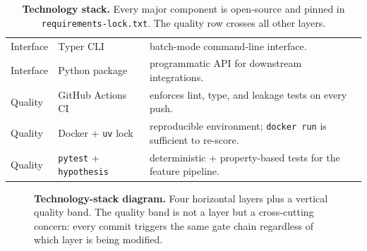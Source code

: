 \documentclass[11pt,a4paper,oneside]{report}
\begin{document}
\begin{table}[htbp]
\begin{tabularx}{\linewidth}{@{}l l X@{}}
Interface &
Typer CLI &
batch-mode command-line interface. \\
Interface &
Python package &
programmatic API for downstream integrations. \\
\midrule
Quality &
GitHub Actions CI &
enforces lint, type, and leakage tests on every push. \\
Quality &
Docker + \texttt{uv} lock &
reproducible environment; \texttt{docker run} is sufficient to re-score. \\
Quality &
\texttt{pytest} + \texttt{hypothesis} &
deterministic + property-based tests for the feature pipeline. \\
\bottomrule
\end{tabularx}
\caption[Technology stack]{\textbf{Technology stack.} Every
major component is open-source and pinned in
\texttt{requirements-lock.txt}. The quality row crosses all
other layers.}
\label{tab:tech-stack}
\end{table}

\begin{figure}[htbp]
\centering
{}
\caption[Technology-stack diagram]{\textbf{Technology-stack
diagram.} Four horizontal layers plus a vertical quality
band. The quality band is not a layer but a cross-cutting
concern: every commit triggers the same gate chain
regardless of which layer is being modified.}
\label{fig:tech-stack}
\end{figure}
\end{document}
